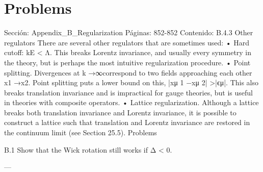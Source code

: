 \section*{Problems}
Sección: Appendix_B_Regularization
Páginas: 852-852
Contenido:
B.4.3 Other regulators
There are several other regulators that are sometimes used:
• Hard cutoff: kE < Λ. This breaks Lorentz invariance, and usually every symmetry in
the theory, but is perhaps the most intuitive regularization procedure.
• Point splitting. Divergences at k →∞correspond to two ﬁelds approaching each other
x1 →x2. Point splitting puts a lower bound on this, |xμ
1 −xμ
2| >|ϵμ|. This also breaks
translation invariance and is impractical for gauge theories, but is useful in theories with
composite operators.
• Lattice regularization. Although a lattice breaks both translation invariance and Lorentz
invariance, it is possible to construct a lattice such that translation and Lorentz invariance
are restored in the continuum limit (see Section 25.5).
Problems

B.1 Show that the Wick rotation still works if Δ < 0.


---

